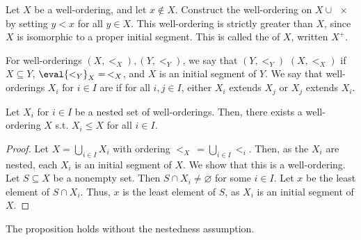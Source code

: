 Let $X$ be a well-ordering, and let $x \not\in X$.
Construct the well-ordering on $X \cup \qty{x}$ by setting $y < x$ for all $y \in X$.
This well-ordering is strictly greater than $X$, since $X$ is isomorphic to a proper initial segment.
This is called the  of $X$, written $X^+$.

For well-orderings $(X, <_X), (Y, <_Y)$, we say that $(Y, <_Y)$  $(X, <_X)$ if $X \subseteq Y$, $\eval{<_Y}_{X} =\, <_X$, and $X$ is an initial segment of $Y$.
We say that well-orderings $X_i$ for $i \in I$ are  if for all $i, j \in I$, either $X_i$ extends $X_j$ or $X_j$ extends $X_i$.
\begin{proposition}
    Let $X_i$ for $i \in I$ be a nested set of well-orderings.
    Then, there exists a well-ordering $X$ s.t. $X_i \leq X$ for all $i \in I$.
\end{proposition}
\begin{proof}
    Let $X = \bigcup_{i \in I} X_i$ with ordering $<_X\, = \bigcup_{i \in I} <_i$.
    Then, as the $X_i$ are nested, each $X_i$ is an initial segment of $X$.
    We show that this is a well-ordering.
    Let $S \subseteq X$ be a nonempty set.
    Then $S \cap X_i \neq \varnothing$ for some $i \in I$.
    Let $x$ be the least element of $S \cap X_i$.
    Thus, $x$ is the least element of $S$, as $X_i$ is an initial segment of $X$.
\end{proof}
\begin{remark}
    The proposition holds without the nestedness assumption.
\end{remark}

